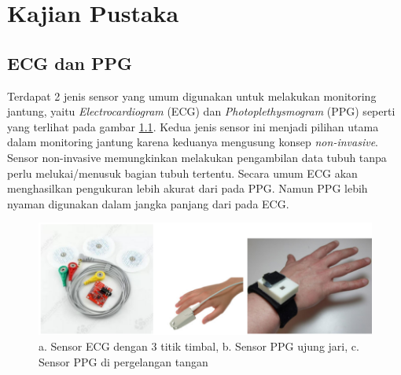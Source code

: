 \chapter{Kajian Pustaka}

\section{ECG dan PPG}
Terdapat 2 jenis sensor yang umum digunakan untuk melakukan monitoring jantung, yaitu \textit{Electrocardiogram} (ECG) dan \textit{Photoplethysmogram} (PPG) seperti yang terlihat pada gambar \ref{fig:ecg_n_ppg}. Kedua jenis sensor ini menjadi pilihan utama dalam monitoring jantung karena keduanya mengusung konsep \textit{non-invasive}. Sensor non-invasive memungkinkan melakukan pengambilan data tubuh tanpa perlu melukai/menusuk bagian tubuh tertentu. Secara umum ECG akan menghasilkan pengukuran lebih akurat dari pada PPG. Namun PPG lebih nyaman digunakan dalam jangka panjang dari pada ECG.

\begin{figure}[h!]
    \centering
    \includegraphics[scale=0.3]{images/sensors.png}
    \caption{a. Sensor ECG dengan 3 titik timbal, b. Sensor PPG ujung jari, c. Sensor PPG di pergelangan tangan}
    \label{fig:ecg_n_ppg}
\end{figure}

